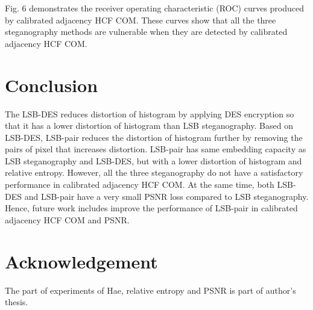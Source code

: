 \documentclass[a4paper,10pt,twocolumn]{article}
\begin{document}
Fig. 6 demonstrates the receiver operating characteristic (ROC) curves produced by calibrated
adjacency HCF COM. These curves show that all the three steganography methods are vulnerable
when they are detected by calibrated adjacency HCF COM.

\section{Conclusion}

The LSB-DES reduces distortion of histogram by applying DES encryption so
that it has a lower distortion of histogram than LSB steganography. Based on
LSB-DES, LSB-pair reduces the distortion of histogram further by removing
the pairs of pixel that increases distortion. LSB-pair has same embedding
capacity as LSB steganography and LSB-DES, but with a lower distortion of
histogram and relative entropy. However, all the three steganography do not
have a satisfactory performance in calibrated adjacency HCF COM. At the
same time, both LSB-DES and LSB-pair have a very small PSNR loss
compared to LSB steganography. Hence, future work includes improve the
performance of LSB-pair in calibrated adjacency HCF COM and PSNR.

\section{Acknowledgement}
The part of experiments of Hae, relative entropy and PSNR is part of author’s
thesis.
\end{document}
